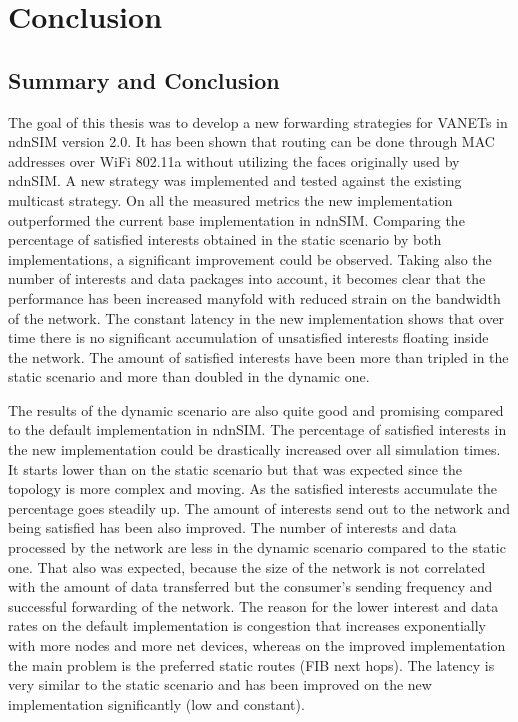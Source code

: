 \chapter{Conclusion}


\section{Summary and Conclusion}

The goal of this thesis was to develop a new forwarding strategies for VANETs in ndnSIM version 2.0. It has been shown that routing can be done through MAC addresses over WiFi 802.11a without utilizing the faces originally used by ndnSIM. A new strategy was implemented and tested against the existing multicast strategy. On all the measured metrics the new implementation outperformed the current base implementation in ndnSIM.
Comparing the percentage of satisfied interests obtained in the static scenario by both implementations, a significant improvement could be observed. Taking also the number of interests and data packages into account, it becomes clear that the performance has been increased manyfold with reduced strain on the bandwidth of the network. The constant latency in the new implementation shows that over time there is no significant accumulation of unsatisfied interests floating inside the network. The amount of satisfied interests have been more than tripled in the static scenario and more than doubled in the dynamic one.

\vspace{5mm} %

The results of the dynamic scenario are also quite good and promising compared to the default implementation in ndnSIM. The percentage of satisfied interests in the new implementation could be drastically increased over all simulation times. It starts lower than on the static scenario but that was expected since the topology is more complex and moving. As the satisfied interests accumulate the percentage goes steadily up. The amount of interests send out to the network and being satisfied has been also improved. The number of interests and data processed by the network are less in the dynamic scenario compared to the static one. That also was expected, because the size of the network is not correlated with the amount of data transferred but the consumer's sending frequency and successful forwarding of the network. The reason for the lower interest and data rates on the default implementation is congestion that increases exponentially with more nodes and more net devices, whereas on the improved implementation the main problem is the preferred static routes (FIB next hops). The latency is very similar to the static scenario and has been improved on the new implementation significantly (low and constant).

